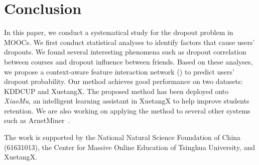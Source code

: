 \section{Conclusion}
	In this paper, we conduct a systematical study for the dropout problem in MOOCs. We first conduct statistical analyses to identify factors that cause users' dropouts. We found several interesting phenomena such as dropout correlation between courses and dropout influence between friends.  
	Based on these analyses, 
we propose a context-aware feature interaction network (\modelname{}) to predict users' dropout probability. Our method achieves good performance on two datasets: KDDCUP and XuetangX.
The	proposed method has been deployed onto \textit{XiaoMu}, an intelligent learning assistant in XuetangX  to help improve students retention. We are also working on applying the method to several other systems such as ArnetMiner~\cite{Tang:08KDD}.


The work is supported by the
National Natural Science Foundation of China (61631013),
the Center for Massive Online Education of Tsinghua University, and XuetangX. 